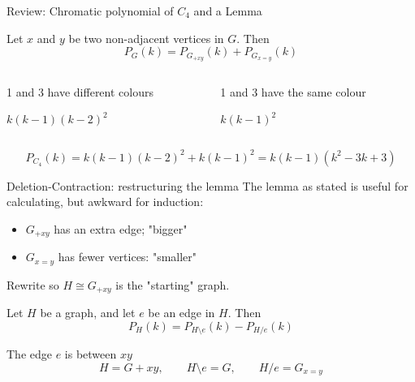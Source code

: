 \documentclass{beamer}
\begin{document}
\begin{frame}{Review: Chromatic polynomial of $C_4$ and a Lemma}  
\begin{lemma}Let $x$ and $y$ be two non-adjacent vertices in $G$.  Then 
$$P_G(k)=P_{G_{+xy}}(k)+P_{G_{x=y}}(k)$$
\end{lemma}

  \begin{columns}
     \begin{column}{.5\textwidth}
\begin{block}{1 and 3 have different colours}

  \centering
$k(k-1)(k-2)^2$
\end{block}
     \end{column}
 \begin{column}{.5\textwidth}
\begin{block}{1 and 3 have the same colour}

  \centering
  
$k(k-1)^2$
\end{block}
     \end{column}
  \end{columns}
$$P_{C_4}(k)=k(k-1)(k-2)^2+k(k-1)^2=k(k-1)(k^2-3k+3)$$  
  \end{frame}
\begin{frame}{Deletion-Contraction: restructuring the lemma}
The lemma as stated is useful for calculating, but awkward for induction:
\begin{itemize}
    \item $G_{+xy}$ has an extra edge; "bigger"
    \item $G_{x=y}$ has fewer vertices: "smaller"
\end{itemize}
Rewrite so $H\cong G_{+xy}$ is the "starting" graph.
\begin{lemma}
Let $H$ be a graph, and let $e$ be an edge in $H$.  Then
$$P_H(k)=P_{H\setminus e}(k)-P_{H/e}(k)$$
\end{lemma}  
The edge $e$ is between $xy$
$$H=G+xy,\qquad H\setminus e=G,\qquad H/e=G_{x=y}$$

\end{frame}  
\end{document}
